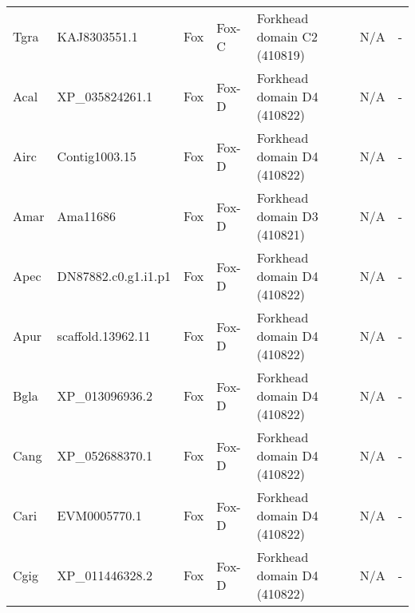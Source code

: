 \documentclass[../main.tex]{subfiles}
\begin{document}
\begin{landscape}
\begin{longtable}{lllllll}
		Tgra           & KAJ8303551.1          & Fox            & Fox-C               & Forkhead domain C2 (410819)                 & N/A                                                                    & -                    \\
		Acal           & XP\_035824261.1       & Fox            & Fox-D               & Forkhead domain D4 (410822)                 & N/A                                                                    & -                    \\
		Airc           & Contig1003.15         & Fox            & Fox-D               & Forkhead domain D4 (410822)                 & N/A                                                                    & -                    \\
		Amar           & Ama11686              & Fox            & Fox-D               & Forkhead domain D3 (410821)                 & N/A                                                                    & -                    \\
		Apec           & DN87882.c0.g1.i1.p1   & Fox            & Fox-D               & Forkhead domain D4 (410822)                 & N/A                                                                    & -                    \\
		Apur           & scaffold.13962.11     & Fox            & Fox-D               & Forkhead domain D4 (410822)                 & N/A                                                                    & -                    \\
		Bgla           & XP\_013096936.2       & Fox            & Fox-D               & Forkhead domain D4 (410822)                 & N/A                                                                    & -                    \\
		Cang           & XP\_052688370.1       & Fox            & Fox-D               & Forkhead domain D4 (410822)                 & N/A                                                                    & -                    \\
		Cari           & EVM0005770.1          & Fox            & Fox-D               & Forkhead domain D4 (410822)                 & N/A                                                                    & -                    \\
		Cgig           & XP\_011446328.2       & Fox            & Fox-D               & Forkhead domain D4 (410822)                 & N/A                                                                    & -                    \\

\end{longtable}
\end{landscape}
\end{document}

